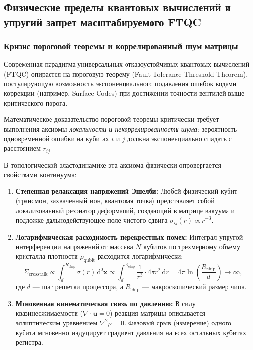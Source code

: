 \documentclass[11pt,a4paper]{article}
\theoremstyle{definition}
\theoremstyle{remark}
\begin{document}
\subsection{Физические пределы квантовых вычислений и упругий запрет масштабируемого FTQC}

\subsubsection{Кризис пороговой теоремы и коррелированный шум матрицы}

Современная парадигма универсальных отказоустойчивых квантовых вычислений (FTQC) опирается на пороговую теорему (Fault-Tolerance Threshold Theorem), постулирующую возможность экспоненциального подавления ошибок кодами коррекции (например, Surface Codes) при достижении точности вентилей выше критического порога.

Математическое доказательство пороговой теоремы критически требует выполнения аксиомы \textit{локальности и некоррелированности шума}: вероятность одновременной ошибки на кубитах $i$ и $j$ должна экспоненциально спадать с расстоянием $r_{ij}$.

В топологической эластодинамике эта аксиома физически опровергается свойствами континуума:
\begin{enumerate}
\item \textbf{Степенная релаксация напряжений Эшелби:} Любой физический кубит (трансмон, захваченный ион, квантовая точка) представляет собой локализованный резонатор деформаций, создающий в матрице вакуума и подложке дальнодействующее поле чистого сдвига $\sigma_{ij}(r) \propto r^{-3}$.
\item \textbf{Логарифмическая расходимость перекрестных помех:} Интеграл упругой интерференции напряжений от массива $N$ кубитов по трехмерному объему кристалла плотности $\rho_{\mathrm{qubit}}$ расходится логарифмически:
\begin{equation}
\Sigma_{\mathrm{crosstalk}} \propto \int_{d}^{R_{\mathrm{chip}}} \sigma(r) \, \mathrm{d}^3\mathbf{x} \propto \int_{d}^{R_{\mathrm{chip}}} \frac{1}{r^3} \cdot 4\pi r^2 \, \mathrm{d}r = 4\pi \ln\left(\frac{R_{\mathrm{chip}}}{d}\right) \to \infty,
\label{eq:eshelby_crosstalk_divergence}
\end{equation}
где $d$ — шаг решетки процессора, а $R_{\mathrm{chip}}$ — макроскопический размер чипа.
\item \textbf{Мгновенная кинематическая связь по давлению:} В силу квазинесжимаемости ($\nabla \cdot \mathbf{u} = 0$) реакция матрицы описывается эллиптическим уравнением $\nabla^2 p = 0$. Фазовый срыв (измерение) одного кубита мгновенно индуцирует градиент давления на всех остальных кубитах регистра.
\end{enumerate}
\end{document}
